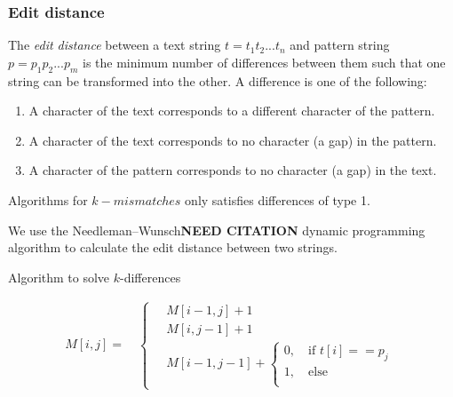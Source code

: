 \subsubsection{Edit distance}

The \emph{edit distance} between a text string $t = t_1 t_2 ... t_n$ and pattern string $p = p_1 p_2  ... p_m$ is the minimum number of differences between them such that one string can be transformed into the other.
A difference is one of the following:

\begin{enumerate}

  \item A character of the text corresponds to a different character of the pattern.
  \item A character of the text corresponds to no character (a gap) in the pattern.
  \item A character of the pattern corresponds to no character (a gap) in the text.

\end{enumerate}

Algorithms for $k-mismatches$ only satisfies differences of type 1.

We use the Needleman–Wunsch{\bf NEED CITATION} dynamic programming algorithm to calculate the edit distance between two strings.


 Algorithm to solve $k$-differences 

\begin{equation}
\begin{aligned}
M[i, j] = \quad
\begin{cases}
\quad M[i - 1, j] + 1 \\
\quad M[i, j-1] + 1 \\
\quad M[i-1, j-1] + \begin{cases} 
0, \quad \text{if }t[i] == p_j \\
1, \quad \text{else } \\
\end{cases}
\end{cases}
\end{aligned}
\end{equation}



